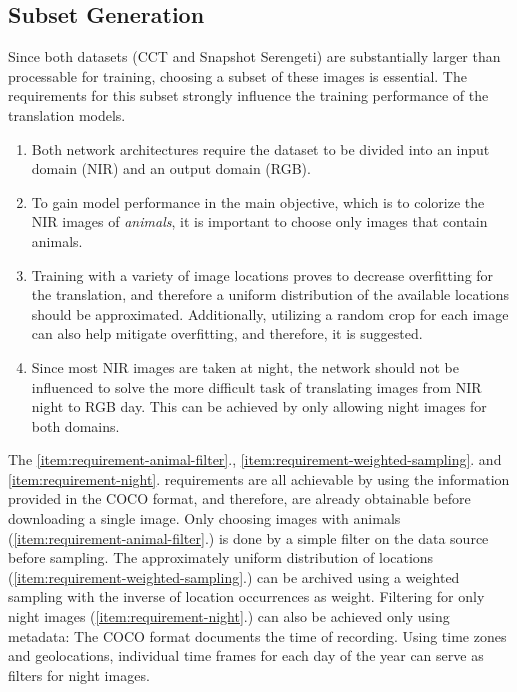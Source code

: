 \subsection{Subset Generation}
Since both datasets (CCT and Snapshot Serengeti) are substantially larger than processable for training, choosing a subset of these images is essential.
The requirements for this subset strongly influence the training performance of the translation models.

\begin{enumerate}
      \item Both network architectures require the dataset to be divided into an input domain (NIR) and an output domain (RGB). \label{item:requirement-split}
      \item To gain model performance in the main objective, which is to colorize the NIR images of \textit{animals}, it is important to choose only images that contain animals. \label{item:requirement-animal-filter}
      \item Training with a variety of image locations proves to decrease overfitting for the translation, and therefore a uniform distribution of the available locations should be approximated.
            Additionally, utilizing a random crop for each image can also help mitigate overfitting, and therefore, it is suggested. \label{item:requirement-weighted-sampling}
      \item Since most NIR images are taken at night, the network should not be influenced to solve the more difficult
            task of translating images from NIR night to RGB day. This can be achieved by only allowing night images for both
            domains. \label{item:requirement-night}
\end{enumerate}


The \ref{item:requirement-animal-filter}., \ref{item:requirement-weighted-sampling}. and \ref{item:requirement-night}. requirements are all achievable by using the information provided in the COCO format, and therefore,
are already obtainable before downloading a single image.
Only choosing images with animals (\ref{item:requirement-animal-filter}.) is done by a simple filter on the data source before sampling.
The approximately uniform distribution of locations (\ref{item:requirement-weighted-sampling}.) can be archived using a weighted sampling with the inverse of location occurrences as weight.
Filtering for only night images (\ref{item:requirement-night}.) can also be achieved only using metadata:
The COCO format documents the time of recording. Using time zones and geolocations, individual time frames for each day of the year can serve as filters for night images.

